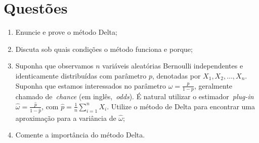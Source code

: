 \documentclass[a4paper,10pt, notitlepage]{report}
\begin{document}
\section*{Questões}
\begin{enumerate}
 \item Enuncie e prove o método Delta;
 \item Discuta sob quais condições o método funciona e porque;
 \item Suponha que observamos $n$ variáveis aleatórias Bernoulli independentes e identicamente distribuídas com parâmetro $p$, denotadas por $X_1, X_2, \ldots, X_n$.
 Suponha que estamos interessados no parâmetro $\omega = \frac{p}{1-p}$, geralmente chamado de~\textit{chance} (em inglês,~\textit{odds}).
 É natural utilizar o estimador~\textit{plug-in} $\hat{\omega} = \frac{\hat{p}}{1-\hat{p}}$, com $\hat{p} = \frac{1}{n}\sum_{i=1}^n X_i$.
  Utilize o método de Delta para encontrar uma aproximação para a variância de $\hat{\omega}$;
  \item Comente a importância do método Delta.
\end{enumerate}






\end{document}
